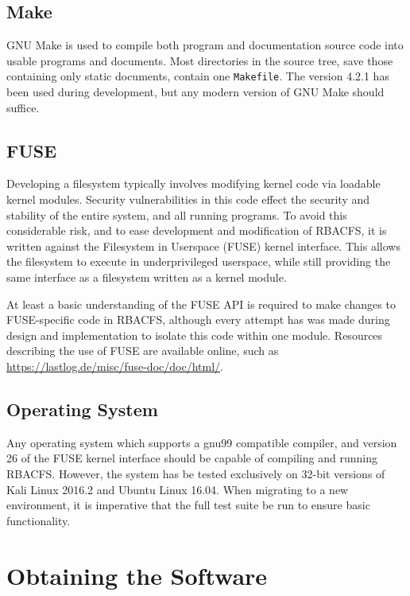 \documentclass[11pt,oneside,letterpaper]{article}
\begin{document}
\subsection{Make}

GNU Make is used to compile both program and documentation source code into
usable programs and documents. Most directories in the source tree, save those
containing only static documents, contain one {\tt Makefile}. The version 4.2.1
has been used during development, but any modern version of GNU Make should
suffice.

\subsection{FUSE}

Developing a filesystem typically involves modifying kernel code via loadable
kernel modules. Security vulnerabilities in this code effect the security and
stability of the entire system, and all running programs. To avoid this
considerable risk, and to ease development and modification of RBACFS, it
is written against the Filesystem in Userspace (FUSE) kernel interface. This
allows the filesystem to execute in underprivileged userspace, while still
providing the same interface as a filesystem written as a kernel module.

At least a basic understanding of the FUSE API is required to make changes
to FUSE-specific code in RBACFS, although every attempt has was made
during design and implementation to isolate this code within one module.
Resources describing the use of FUSE are available online, such as
\url{https://lastlog.de/misc/fuse-doc/doc/html/}.

\subsection{Operating System}

Any operating system which supports a gnu99 compatible compiler, and version 26
of the FUSE kernel interface should be capable of compiling and running RBACFS.
However, the system has be tested exclusively on 32-bit versions of Kali Linux
2016.2 and Ubuntu Linux 16.04. When migrating to a new environment, it is
imperative that the full test suite be run to ensure basic functionality.

\section{Obtaining the Software}
\label{sec:obtain}
\end{document}
